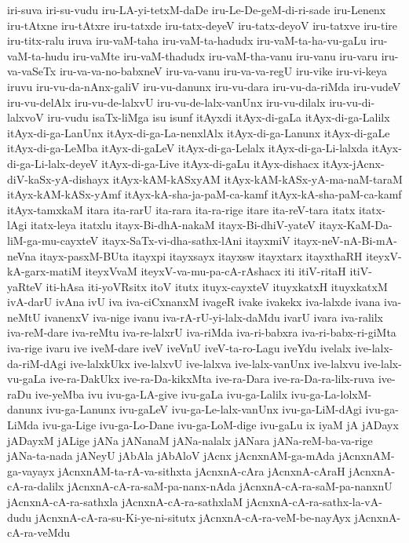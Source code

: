 {iri-suva
iri-su-vudu
iru-LA-yi-tetxM-daDe
iru-Le-De-geM-di-ri-sade
iru-Lenenx
iru-tAtxne
iru-tAtxre
iru-tatxde
iru-tatx-deyeV
iru-tatx-deyoV
iru-tatxve
iru-tire
iru-titx-ralu
iruva
iru-vaM-taha
iru-vaM-ta-hadudx
iru-vaM-ta-ha-vu-gaLu
iru-vaM-ta-hudu
iru-vaMte
iru-vaM-thadudx
iru-vaM-tha-vanu
iru-vanu
iru-varu
iru-va-vaSeTx
iru-va-va-no-babxneV
iru-va-vanu
iru-va-va-regU
iru-vike
iru-vi-keya
iruvu
iru-vu-da-nAnx-galiV
iru-vu-danunx
iru-vu-dara
iru-vu-da-riMda
iru-vudeV
iru-vu-delAlx
iru-vu-de-lalxvU
iru-vu-de-lalx-vanUnx
iru-vu-dilalx
iru-vu-di-lalxvoV
iru-vudu
isaTx-liMga
isu
isunf
itAyxdi
itAyx-di-gaLa
itAyx-di-ga-Lalilx
itAyx-di-ga-LanUnx
itAyx-di-ga-La-nenxlAlx
itAyx-di-ga-Lanunx
itAyx-di-gaLe
itAyx-di-ga-LeMba
itAyx-di-gaLeV
itAyx-di-ga-Lelalx
itAyx-di-ga-Li-lalxda
itAyx-di-ga-Li-lalx-deyeV
itAyx-di-ga-Live
itAyx-di-gaLu
itAyx-dishacx
itAyx-jAcnx-diV-kaSx-yA-dishayx
itAyx-kAM-kASxyAM
itAyx-kAM-kASx-yA-ma-naM-taraM
itAyx-kAM-kASx-yAmf
itAyx-kA-sha-ja-paM-ca-kamf
itAyx-kA-sha-paM-ca-kamf
itAyx-tamxkaM
itara
ita-rarU
ita-rara
ita-ra-rige
itare
ita-reV-tara
itatx
itatx-lAgi
itatx-leya
itatxlu
itayx-Bi-dhA-nakaM
itayx-Bi-dhiV-yateV
itayx-KaM-Da-liM-ga-mu-cayxteV
itayx-SaTx-vi-dha-sathx-lAni
itayxmiV
itayx-neV-nA-Bi-mA-neVna
itayx-pasxM-BUta
itayxpi
itayxsayx
itayxsw
itayxtarx
itayxthaRH
iteyxV-kA-garx-matiM
iteyxVvaM
iteyxV-va-mu-pa-cA-rAshacx
iti
itiV-ritaH
itiV-yaRteV
iti-hAsa
iti-yoVRsitx
itoV
itutx
ituyx-cayxteV
ituyxkatxH
ituyxkatxM
ivA-darU
ivAna
ivU
iva
iva-ciCxnanxM
ivageR
ivake
ivakekx
iva-lalxde
ivana
iva-neMtU
ivanenxV
iva-nige
ivanu
iva-rA-rU-yi-lalx-daMdu
ivarU
ivara
iva-ralilx
iva-reM-dare
iva-reMtu
iva-re-lalxrU
iva-riMda
iva-ri-babxra
iva-ri-babx-ri-giMta
iva-rige
ivaru
ive
iveM-dare
iveV
iveVnU
iveV-ta-ro-Lagu
iveYdu
ivelalx
ive-lalx-da-riM-dAgi
ive-lalxkUkx
ive-lalxvU
ive-lalxva
ive-lalx-vanUnx
ive-lalxvu
ive-lalx-vu-gaLa
ive-ra-DakUkx
ive-ra-Da-kikxMta
ive-ra-Dara
ive-ra-Da-ra-lilx-ruva
ive-raDu
ive-yeMba
ivu
ivu-ga-LA-give
ivu-gaLa
ivu-ga-Lalilx
ivu-ga-La-lolxM-danunx
ivu-ga-Lanunx
ivu-gaLeV
ivu-ga-Le-lalx-vanUnx
ivu-ga-LiM-dAgi
ivu-ga-LiMda
ivu-ga-Lige
ivu-ga-Lo-Dane
ivu-ga-LoM-dige
ivu-gaLu
ix
iyaM
jA
jADayx
jADayxM
jALige
jANa
jANanaM
jANa-nalalx
jANara
jANa-reM-ba-va-rige
jANa-ta-nada
jANeyU
jAbAla
jAbAloV
jAcnx
jAcnxnAM-ga-mAda
jAcnxnAM-ga-vayayx
jAcnxnAM-ta-rA-va-sithxta
jAcnxnA-cAra
jAcnxnA-cAraH
jAcnxnA-cA-ra-dalilx
jAcnxnA-cA-ra-saM-pa-nanx-nAda
jAcnxnA-cA-ra-saM-pa-nanxnU
jAcnxnA-cA-ra-sathxla
jAcnxnA-cA-ra-sathxlaM
jAcnxnA-cA-ra-sathx-la-vA-dudu
jAcnxnA-cA-ra-su-Ki-ye-ni-situtx
jAcnxnA-cA-ra-veM-be-nayAyx
jAcnxnA-cA-ra-veMdu
}
